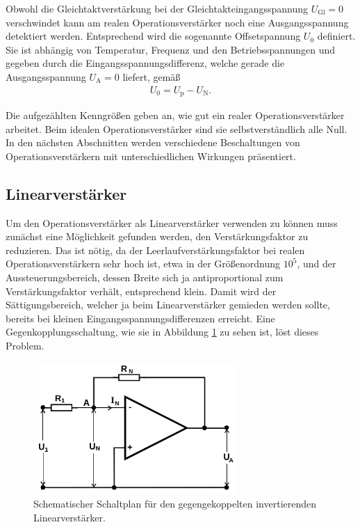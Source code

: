 Obwohl die Gleichtaktverstärkung bei der Gleichtakteingangsspannung $U_\text{Gl} = 0$ verschwindet
kann am realen Operationsverstärker noch eine Ausgangsspannung detektiert werden. Entsprechend wird die sogenannte
Offsetspannung $U_0$ definiert. Sie ist abhängig von Temperatur, Frequenz und den Betriebsspannungen und gegeben
durch die Eingangsspannungsdifferenz, welche gerade die Ausgangsspannung $U_\text{A} = 0$ liefert, gemäß
\begin{align}
  U_0 = U_\text{p} - U_\text{N}.
\end{align}

Die aufgezählten Kenngrößen geben an, wie gut ein realer Operationsverstärker arbeitet. Beim idealen
Operationsverstärker sind sie selbstverständlich alle Null. In den nächsten Abschnitten werden verschiedene
Beschaltungen von Operationsverstärkern mit unterschiedlichen Wirkungen präsentiert.

\subsection{Linearverstärker}
\label{sec:linv}

Um den Operationsverstärker als Linearverstärker verwenden zu können muss zunächst eine Möglichkeit gefunden werden,
den Verstärkungsfaktor zu reduzieren. Das ist nötig, da der Leerlaufverstärkungsfaktor bei realen Operationsverstärkern
sehr hoch ist, etwa in der Größenordnung $10^5$, und der Aussteuerungsbereich, dessen Breite sich ja antiproportional
zum Verstärkungsfaktor verhält, entsprechend klein. Damit wird der Sättigungsbereich, welcher ja beim Linearverstärker
gemieden werden sollte, bereits bei kleinen Eingangsspannungsdifferenzen erreicht.
Eine Gegenkopplungsschaltung, wie sie in Abbildung \ref{fig:gegenkopplung} zu sehen ist, löst dieses Problem.

\begin{figure}
  \centering
  \includegraphics[height=5cm]{ImmerDieseNorweger/gegenkopplung.png}
  \caption{Schematischer Schaltplan für den gegengekoppelten invertierenden Linearverstärker\cite{anleitung}.}
  \label{fig:gegenkopplung}
\end{figure}


